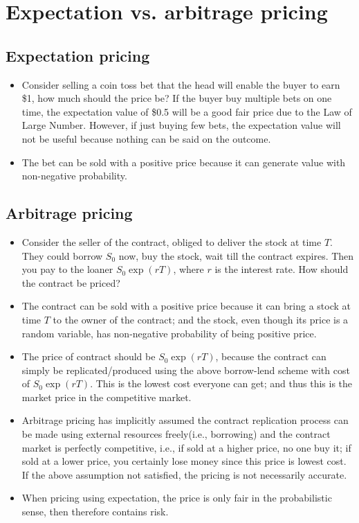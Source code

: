 \documentclass[a4paper,13pt]{report}
\begin{document}
\section{Expectation vs. arbitrage pricing \cite{baxter1996financial}}
\subsection{Expectation pricing}
\begin{itemize}
    \item Consider selling a coin toss bet that the head will enable the buyer to earn \$1, how much should the price be? If the buyer buy multiple bets on one time, the expectation value of \$0.5 will be a good fair price due to the Law of Large Number. However, if just buying few bets, the expectation value will not be useful because nothing can be said on the outcome. 
    \item The bet can be sold with a positive price because it can generate value with non-negative probability. 
\end{itemize}
\subsection{Arbitrage pricing}
\begin{itemize}
    \item Consider the seller of the contract, obliged to deliver the stock at time $T$. They could borrow $S_0$ now, buy the stock, wait till the contract expires. Then you pay to the loaner $S_0 \exp(rT)$, where $r$ is the interest rate. How should the contract be priced? 
    \item The contract can be sold with a positive price because it can bring a stock at time $T$ to the owner of the contract; and the stock, even though its price is a random variable, has non-negative probability of being positive price. 
    \item The price of contract should be $S_0 \exp(rT)$, because the contract can simply be replicated/produced using the above borrow-lend scheme with cost of $S_0 \exp(rT)$. This is the lowest cost everyone can get; and thus this is the market price in the competitive market. 
    \item Arbitrage pricing has implicitly assumed the contract replication process can be made using external resources freely(i.e., borrowing) and the contract market is perfectly competitive, i.e., if sold at a higher price, no one buy it; if sold at a lower price, you certainly lose money since this price is lowest cost. If the above assumption not satisfied, the pricing is not necessarily accurate.  
\item When pricing using expectation, the price is only fair in the probabilistic sense, then therefore contains risk. 
    
\end{itemize}
\end{document}
